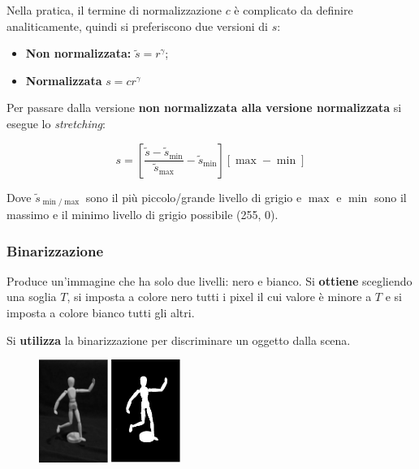 \documentclass[a4paper]{article}
\begin{document}
	\noindent
	Nella pratica, il termine di normalizzazione $c$ è complicato da definire analiticamente, quindi si preferiscono due versioni di $s$:
	
	\begin{itemize}
		\item \textbf{Non normalizzata:} $\tilde{s} = r^{\gamma}$;
		
		\item \textbf{Normalizzata} $s = cr^{\gamma}$
	\end{itemize}

	\noindent
	Per passare dalla versione \textbf{non normalizzata alla versione normalizzata} si esegue lo \emph{stretching}:
	
	\begin{equation*}
		s = \left[\dfrac{\tilde{s} - \tilde{s}_{\min}}{\tilde{s}_{\max}} - \tilde{s}_{\min}\right] \left[\max-\min\right]
	\end{equation*}

	\noindent
	Dove $\tilde{s}_{\min / \max}$ sono il più piccolo/grande livello di grigio e $\max$ e $\min$ sono il massimo e il minimo livello di grigio possibile (255, 0).
	
	\subsubsection{Binarizzazione}
	
	Produce un'immagine che ha solo due livelli: nero e bianco. Si \textbf{ottiene} scegliendo una soglia $T$, si imposta a colore nero tutti i pixel il cui valore è minore a $T$ e si imposta a colore bianco tutti gli altri.\newline
	
	\noindent
	Si \textbf{utilizza} la binarizzazione per discriminare un oggetto dalla scena.
	
	\begin{figure}[!htp]
		\centering
		\includegraphics[width=0.2\textwidth]{img/binarizzazione1.png}
		\includegraphics[width=0.2\textwidth]{img/binarizzazione2.png}
	\end{figure}
\end{document}
